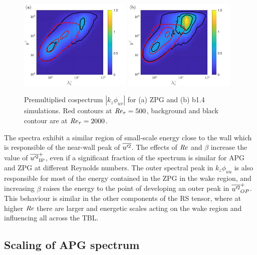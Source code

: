 \begin{figure}[h!]
\centering
\includegraphics[width=0.48\textwidth]{ZPG_uv.jpg}
\includegraphics[width=0.48\textwidth]{APG_uv.jpg}
\caption{ \label{fig:ZPG_APG_Ret_500_2000_uv} Premultiplied cospectrum $|k_z\phi_{uv}|$ for (a) ZPG and (b) b1.4 simulations. Red contours at $\mbox{\textit{Re}}_{\tau}=500$, background and black contour are at $\mbox{\textit{Re}}_{\tau}=2000$. }
\end{figure}

The spectra exhibit a similar region of small-scale energy close to the wall which is responsible of the near-wall peak of $\overline{u^{\prime}\mkern-1.2mu^2}$. The effects of $\mbox{\textit{Re}}$ and $\beta$ increase the value of $\overline{u^{\prime}\mkern-1.2mu ^2}_{\rm IP}^+$, even if a significant fraction of the spectrum is similar for APG and ZPG at different Reynolds numbers.
The outer spectral peak in $k_z\phi_{uu}$ is also responsible for most of the energy contained in the ZPG in the wake region, and increasing $\beta$ raises the energy to the point of developing an outer peak in $\overline{u^{\prime}\mkern-1.2mu^2}_{OP}^+$. This behaviour is similar in the other components of the RS tensor, where at higher $\mbox{\textit{Re}}$ there are larger and energetic scales acting on the wake region and influencing all across the TBL.

\subsection{Scaling of APG spectrum}

